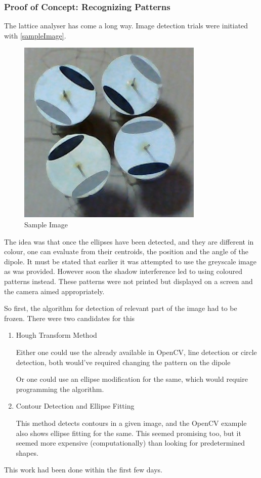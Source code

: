 		\subsubsection{Proof of Concept: Recognizing Patterns}
			The lattice analyser has come a long way. Image detection trials were initiated with \autoref{sampleImage}. 
			\begin{figure}[bth]
				\begin{center}
					\includegraphics[width=0.7\linewidth]{gfx/picture002.jpg}
				\end{center}
			\caption[Sample Image]{Sample Image}
			\label{sampleImage}
			\end{figure}

			The idea was that once the ellipses have been detected, and they are different in colour, one can evaluate from their centroids, the position and the angle of the dipole. It must be stated that earlier it was attempted to use the greyscale image as was provided. However soon the shadow interference led to using coloured patterns instead. These patterns were not printed but displayed on a screen and the camera aimed appropriately.
			\par
			So first, the algorithm for detection of relevant part of the image had to be frozen. There were two candidates for this
			\begin{enumerate}
				\item Hough Transform Method
					\par
					Either one could use the already available in OpenCV, line detection or circle detection, both would've required changing the pattern on the dipole
					\par
					Or one could use an ellipse modification for the same, which would require programming the algorithm.
				\item Contour Detection and Ellipse Fitting
					\par
					This method detects contours in a given image, and the OpenCV example also shows ellipse fitting for the same. This seemed promising too, but it seemed more expensive (computationally) than looking for predetermined shapes.
			\end{enumerate}
			This work had been done within the first few days. 
			\par

